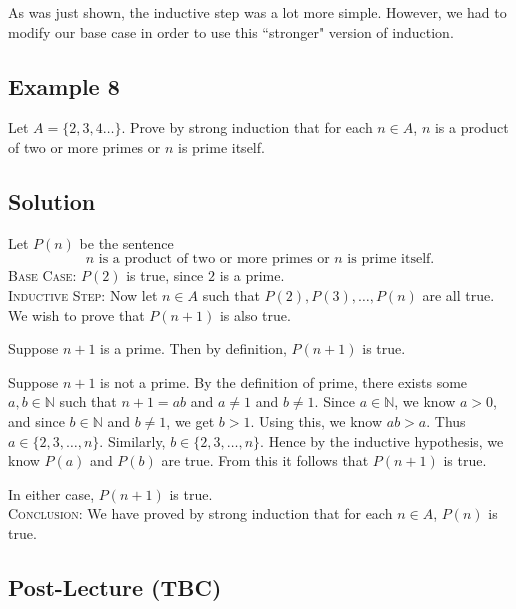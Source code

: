 \documentclass{article}
\begin{document}
    \vspace{1.5mm}
    As was just shown, the inductive step was a lot more simple. However, we had to modify our base case in order to use this ``stronger" version of induction.

\subsection*{Example 8}
    Let $A = \{2, 3, 4 \dots\}$. Prove by strong induction that for each $n \in A$, $n$ is a product of two or more primes or $n$ is prime itself.

\subsection*{Solution}
    Let $P(n)$ be the sentence $$\text{$n$ is a product of two or more primes or $n$ is prime itself}.$$
    \textsc{Base Case}: $P(2)$ is true, since $2$ is a prime. \\
    \textsc{Inductive Step}: Now let $n \in A$ such that $P(2), P(3), \dots, P(n)$ are all true. We wish to prove that $P(n + 1)$ is also true.
    
    \begin{Cases}
        \item Suppose $n + 1$ is a prime. Then by definition, $P(n + 1)$ is true.
        \item Suppose $n + 1$ is not a prime. By the definition of prime, there exists some $a, b \in \mathbb{N}$ such that $n + 1 = ab$ and $a \ne 1$ and $b \ne 1$. Since $a \in \mathbb{N}$, we know $a > 0$, and since $b \in \mathbb{N}$ and $b \ne 1$, we get $b > 1$. Using this, we know $ab > a$. Thus $a \in \{2, 3, \dots, n\}$. Similarly, $b \in \{2, 3, \dots, n\}$. Hence by the inductive hypothesis, we know $P(a)$ and $P(b)$ are true. From this it follows that $P(n + 1)$ is true.
    \end{Cases}
    In either case, $P(n + 1)$ is true. \\
    \textsc{Conclusion}: We have proved by strong induction that for each $n \in A$, $P(n)$ is true.

\subsection*{Post-Lecture (TBC)}
\end{document}
